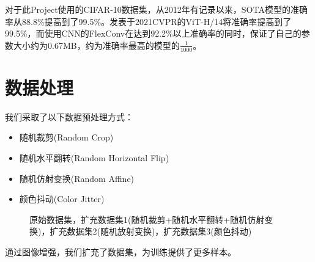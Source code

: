 \documentclass[hyperref, UTF8, 12pt]{article}
\theoremstyle{definition}
\begin{document}
\indent 对于此Project使用的CIFAR-10数据集，从2012年有记录以来，SOTA模型的准确率从88.8\%提高到了99.5\%。发表于2021CVPR的ViT-H/14将准确率提高到了99.5\%\cite{dosovitskiy2021image}，而使用CNN的FlexConv在达到92.2\%以上准确率的同时\cite{romero2021flexconv}，保证了自己的参数大小约为0.67MB，约为准确率最高的模型的$\frac{1}{1000}$。


\section{数据处理}
我们采取了以下数据预处理方式：
\begin{itemize}
\item 随机裁剪(Random Crop)
\item 随机水平翻转(Random Horizontal Flip)
\item 随机仿射变换(Random Affine)
\item 颜色抖动(Color Jitter)
\end{itemize}

\begin{figure}[H]
	\centering
	\caption{原始数据集，扩充数据集1(随机裁剪+随机水平翻转+随机仿射变换)，扩充数据集2(随机放射变换)，扩充数据集3(颜色抖动)}
\end{figure}
通过图像增强，我们扩充了数据集，为训练提供了更多样本。
\end{document}
